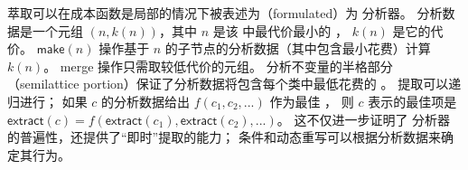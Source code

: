 萃取可以在成本函数是局部的情况下被表述为（formulated）为 \eclass 分析器。 %
分析数据是一个元组 $(n, k(n))$，其中 $n$ 是该 \eclass 中最代价最小的 \enode，
  $k(n)$ 是它的代价。
$\textsf{make}(n)$ 操作基于 $n$ 的子节点的分析数据（其中包含最小花费）计算 $k(n)$。
\textsf{merge} 操作只需取较低代价的元组。
分析不变量的半格部分（semilattice portion）保证了分析数据将包含每个类中最低花费的 \enode。
提取可以递归进行；
  如果 \eclass $c$ 的分析数据给出 $f(c_{1}, c_{2}, ...)$ 作为最佳 \enode，
  则 $c$ 表示的最佳项是  
  $\textsf{extract}(c) = f( \textsf{extract}(c_{1}), \textsf{extract}(c_{2}), ... )$。
这不仅进一步证明了 \eclass 分析器的普遍性，还提供了“即时”提取的能力；
  条件和动态重写可以根据分析数据来确定其行为。

